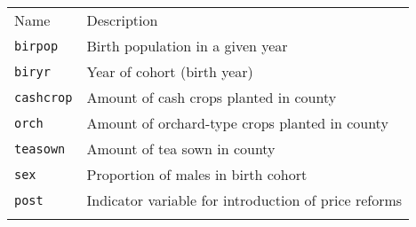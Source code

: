 \documentclass[]{article}
\begin{document}
\begin{longtable}[c]{@{}ll@{}}
\toprule\addlinespace
\begin{minipage}[b]{0.24\columnwidth}\raggedright
Name
\end{minipage} & \begin{minipage}[b]{0.69\columnwidth}\raggedright
Description
\end{minipage}
\\\addlinespace
\midrule\endhead
\begin{minipage}[t]{0.24\columnwidth}\raggedright
\texttt{birpop}
\end{minipage} & \begin{minipage}[t]{0.69\columnwidth}\raggedright
Birth population in a given year
\end{minipage}
\\\addlinespace
\begin{minipage}[t]{0.24\columnwidth}\raggedright
\texttt{biryr}
\end{minipage} & \begin{minipage}[t]{0.69\columnwidth}\raggedright
Year of cohort (birth year)
\end{minipage}
\\\addlinespace
\begin{minipage}[t]{0.24\columnwidth}\raggedright
\texttt{cashcrop}
\end{minipage} & \begin{minipage}[t]{0.69\columnwidth}\raggedright
Amount of cash crops planted in county
\end{minipage}
\\\addlinespace
\begin{minipage}[t]{0.24\columnwidth}\raggedright
\texttt{orch}
\end{minipage} & \begin{minipage}[t]{0.69\columnwidth}\raggedright
Amount of orchard-type crops planted in county
\end{minipage}
\\\addlinespace
\begin{minipage}[t]{0.24\columnwidth}\raggedright
\texttt{teasown}
\end{minipage} & \begin{minipage}[t]{0.69\columnwidth}\raggedright
Amount of tea sown in county
\end{minipage}
\\\addlinespace
\begin{minipage}[t]{0.24\columnwidth}\raggedright
\texttt{sex}
\end{minipage} & \begin{minipage}[t]{0.69\columnwidth}\raggedright
Proportion of males in birth cohort
\end{minipage}
\\\addlinespace
\begin{minipage}[t]{0.24\columnwidth}\raggedright
\texttt{post}
\end{minipage} & \begin{minipage}[t]{0.69\columnwidth}\raggedright
Indicator variable for introduction of price reforms
\end{minipage}
\\\addlinespace
\bottomrule
\end{longtable}
\end{document}
